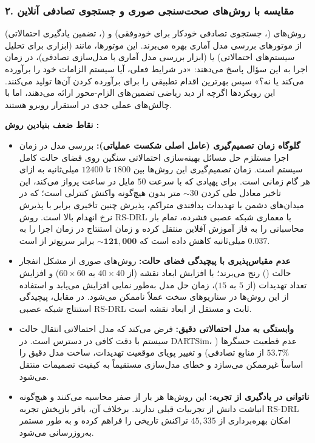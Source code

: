 \documentclass[oneside,openany,a4paper,12pt]{article}
\begin{document}
\subsubsection{۲. مقایسه با روش‌های صحت‌سنجی صوری و جستجوی تصادفی آنلاین }

روش‌های  (، جستجوی تصادفی خودکار برای خودوفقی) و  (، تضمین یادگیری احتمالاتی) از موتورهای بررسی مدل آماری بهره می‌برند. این موتورها، مانند  (ابزاری برای تحلیل سیستم‌های احتمالاتی) یا  (ابزار بررسی مدل آماری با مدل‌سازی تصادفی)، در زمان اجرا به این سؤال پاسخ می‌دهند: «در شرایط فعلی، آیا سیستم الزامات خود را برآورده می‌کند یا نه؟» سپس بهرترین اقدام تطبیقی را برای برآورده کردن آن‌ها تولید می‌کنند. این رویکردها اگرچه از دید ریاضی تضمین‌های الزام-محور ارائه می‌دهند، اما با چالش‌های عملی جدی در استقرار روبرو هستند.

\textbf{نقاط ضعف بنیادین روش :}
\begin{itemize}
    \item \textbf{گلوگاه زمان تصمیم‌گیری (عامل اصلی شکست عملیاتی):} بررسی مدل در زمان اجرا مستلزم حل مسائل بهینه‌سازی احتمالاتی سنگین روی فضای حالت کامل سیستم است. زمان تصمیم‌گیری این روش‌ها بین $1800$ تا $12400$ میلی‌ثانیه به ازای هر گام زمانی است. برای پهپادی که با سرعت $50$ مایل در ساعت پرواز می‌کند، این تاخیر معادل طی کردن $\sim 30$ متر بدون هیچ‌گونه واکنش کنترلی است؛ که در میدان‌های دشمن با تهدیدات پدافندی متراکم، پذیرش چنین تاخیری برابر با پذیرش نرخ انهدام بالا است. روش RS-DRL با معماری شبکه عصبی  فشرده، تمام بار محاسباتی را به فاز آموزش آفلاین منتقل کرده و زمان استنتاج در زمان اجرا را به $0.037$ میلی‌ثانیه کاهش داده است که $\sim\mathbf{121{,}000}$ برابر سریع‌تر از  است.
    \item \textbf{عدم مقیاس‌پذیری با پیچیدگی فضای حالت:} روش‌های صوری از مشکل انفجار حالت () رنج می‌برند؛ با افزایش ابعاد نقشه (از $40 \times 40$ به $60 \times 60$) و افزایش تعداد تهدیدات (از $5$ به $15$)، زمان حل مدل به‌طور نمایی افزایش می‌یابد و استفاده از این روش‌ها در سناریوهای سخت عملاً ناممکن می‌شود. در مقابل، پیچیدگی استنتاج شبکه عصبی RS-DRL ثابت و مستقل از ابعاد نقشه است.
    \item \textbf{وابستگی به مدل احتمالاتی دقیق:}  فرض می‌کند که مدل احتمالاتی انتقال حالت سیستم با دقت کافی در دسترس است. در DARTSim، عدم قطعیت حسگرها ($53.7\%$ از منابع تصادفی) و تغییر پویای موقعیت تهدیدات، ساخت مدل دقیق را اساساً غیرممکن می‌سازد و خطای مدل‌سازی مستقیماً به کیفیت تصمیمات منتقل می‌شود.
    \item \textbf{ناتوانی در یادگیری از تجربه:} این روش‌ها هر بار از صفر محاسبه می‌کنند و هیچ‌گونه انباشت دانش از تجربیات قبلی ندارند. برخلاف آن، بافر بازپخش تجربه RS-DRL امکان بهره‌برداری از $45{,}335$ تراکنش تاریخی را فراهم کرده و به طور مستمر به‌روزرسانی می‌شود.
\end{itemize}
\end{document}
